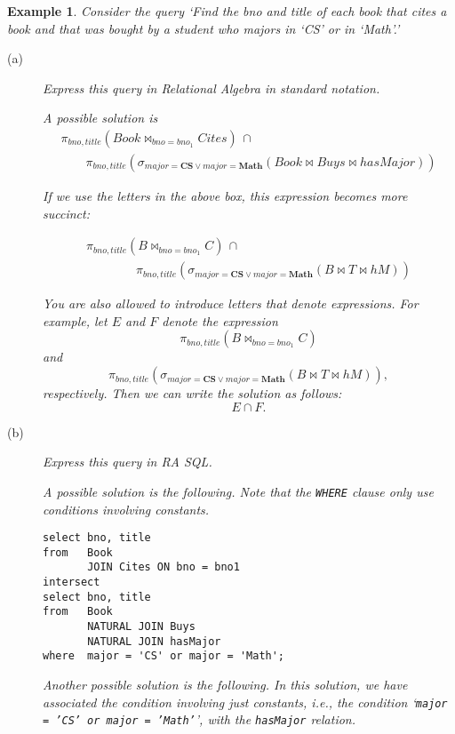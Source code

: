 \documentclass[11pt]{article}
\newtheorem{example}{Example}
\begin{document}
\begin{example}\label{RAquery}
Consider the query `\emph{Find the bno and title of each book that cites a book  and that was bought by a student who majors in `CS' or in `Math'}.'


\begin{description}
\item[(a)]  Express this query in Relational Algebra in standard notation.

A possible solution is
{
\[
\begin{array}{l}
\pi_{bno,title}(Book\bowtie_{bno=bno_1} Cites)\, \cap\,\\
\qquad 
\pi_{bno,title}(\sigma_{major = \mathbf{CS}\lor major = \mathbf{Math}}(Book \bowtie Buys \bowtie hasMajor))
\end{array}
\]
}

If we use the letters in the above box, this expression becomes more succinct:

{
\[
\begin{array}{l}
\pi_{bno,title}(B\bowtie_{bno=bno_1} C)\, \cap\, \\
\qquad\qquad \pi_{bno,title}(\sigma_{major = \mathbf{CS}\lor major = \mathbf{Math}}(B \bowtie T \bowtie hM))
\end{array}
\]
}

You are also allowed to introduce letters that denote expressions.  For example, let $E$ and $F$ denote the expression
\[\pi_{bno,title}(B\bowtie_{bno=bno_1} C) \]
and
\[\pi_{bno,title}(\sigma_{major = \mathbf{CS}\lor major = \mathbf{Math}}(B \bowtie T \bowtie hM)),\]
respectively. Then we can write the solution as follows:
\[E\cap F.\]

\item[(b)]  Express this query in RA SQL.   

A possible solution is the following.
Note that the {\tt WHERE} clause only use conditions involving constants.
{\small
\begin{verbatim}
select bno, title
from   Book 
       JOIN Cites ON bno = bno1
intersect
select bno, title
from   Book 
       NATURAL JOIN Buys 
       NATURAL JOIN hasMajor
where  major = 'CS' or major = 'Math';
\end{verbatim}
}                    

\newpage
Another possible solution is the following.
In this solution, we have associated the condition involving just constants, i.e., the condition `{\tt major = 'CS' or major = 'Math'}',
with the {\tt hasMajor} relation.


\end{description}
\end{example}
\end{document}
